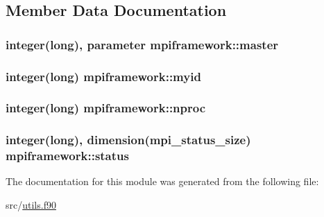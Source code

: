 \subsection{Member Data Documentation}
\hypertarget{classmpiframework_ae3cf75bc4150b05cabe037cf7478d4a0}{
\subsubsection[{master}]{\setlength{\rightskip}{0pt plus 5cm}integer(long), parameter mpiframework\-::master}}\label{classmpiframework_ae3cf75bc4150b05cabe037cf7478d4a0}
\hypertarget{classmpiframework_ae833a6cbdc45698ffa99a650f0e6bb2d}{
\subsubsection[{myid}]{\setlength{\rightskip}{0pt plus 5cm}integer(long) mpiframework\-::myid}}\label{classmpiframework_ae833a6cbdc45698ffa99a650f0e6bb2d}
\hypertarget{classmpiframework_af70b38210cb3bcccdc873618ffb3de35}{
\subsubsection[{nproc}]{\setlength{\rightskip}{0pt plus 5cm}integer(long) mpiframework\-::nproc}}\label{classmpiframework_af70b38210cb3bcccdc873618ffb3de35}
\hypertarget{classmpiframework_ab7c6b211b6d67a29e8b7e2cefe97d5b2}{
\subsubsection[{status}]{\setlength{\rightskip}{0pt plus 5cm}integer(long), dimension(mpi\-\_\-status\-\_\-size) mpiframework\-::status}}\label{classmpiframework_ab7c6b211b6d67a29e8b7e2cefe97d5b2}


The documentation for this module was generated from the following file\-:\begin{DoxyCompactItemize}
\item 
src/\hyperlink{utils_8f90}{utils.\-f90}\end{DoxyCompactItemize}
